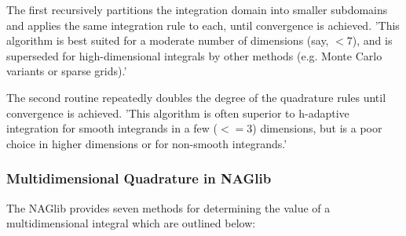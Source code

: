 The first recursively partitions the integration domain into smaller subdomains and applies the same integration rule to each, until convergence is achieved. 'This algorithm is best suited for a moderate number of dimensions (say, $< 7$), and is superseded for high-dimensional integrals by other methods (e.g. Monte Carlo variants or sparse grids).'

The second routine repeatedly doubles the degree of the quadrature rules until convergence is achieved. 'This algorithm is often superior to h-adaptive integration for smooth integrands in a few ($<=3$) dimensions, but is a poor choice in higher dimensions or for non-smooth integrands.' \cite{Johnson}

\subsubsection{Multidimensional Quadrature in NAGlib}
The NAGlib provides seven methods for determining the value of a multidimensional integral which are outlined below:

